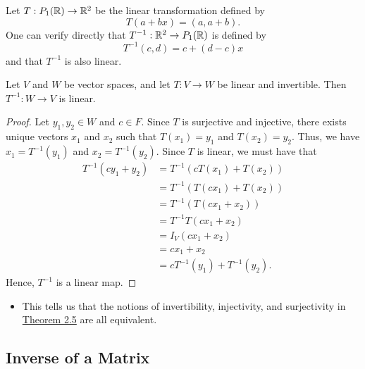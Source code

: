 \begin{eg}\label{Eg 2.4.1}
    Let \( T: {P}_{1}(\mathbb{R}) \to \mathbb{R}^{2}  \) be the linear transformation defined by
    \[  T(a+bx) = (a, a+b). \]
    One can verify directly that \( T^{-1}: \mathbb{R}^{2} \to {P}_{1}(\mathbb{R}) \) is defined by 
    \[  T^{-1}(c,d) = c + (d-c)x \]
    and that \( T^{-1} \) is also linear.
\end{eg}

\begin{theorem}
    Let \( V  \) and \( W  \) be vector spaces, and let \( T: V \to W  \) be linear and invertible. Then \( T^{-1}: W \to V  \) is linear.
\end{theorem}
\begin{proof}
Let \( {y}_{1}, {y}_{2} \in W  \) and \( c \in F  \). Since \( T  \) is surjective and injective, there exists unique vectors \( {x}_{1}  \) and \( {x}_{2}  \) such that \( T({x}_{1}) = {y}_{1}  \) and \( T({x}_{2}) = {y}_{2} \). Thus, we have \( {x}_{1} = T^{-1}({y}_{1})  \) and \( {x}_{2} = T^{-1}({y}_{2}) \). Since \( T  \) is linear, we must have that
\begin{align*}
    T^{-1}( c {y}_{1} + {y}_{2}) &= T^{-1}( c T({x}_{1}) + T({x}_{2})) \\
                                 &= T^{-1}( T(c {x}_{1}) + T({x}_{2})) \\
                                 &= T^{-1}(T({cx}_{1} + {x}_{2})) \\
                                 &= T^{-1}T({cx}_{1} + {x}_{2}) \\
                                 &= {I}_{V}({cx}_{1} + {x}_{2}) \\
                                 &= {cx}_{1} + {x}_{2} \\
                                 &= c T^{-1}({y}_{1}) + T^{-1}({y}_{2}).
\end{align*}
Hence, \( T^{-1} \) is a linear map.
\end{proof}

\begin{itemize}
    \item This tells us that the notions of invertibility, injectivity, and surjectivity in {\hyperref[Theorem 2.5]{Theorem 2.5}} are all equivalent. 
\end{itemize}

\subsection{Inverse of a Matrix}

